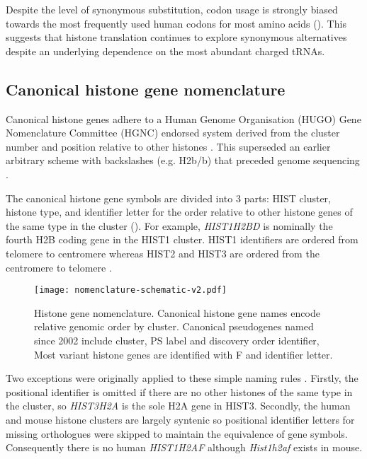 	Despite the level of synonymous substitution, 
	codon usage is strongly biased towards the most frequently used human codons for most amino acids (). 
	This suggests that histone translation continues to explore synonymous alternatives 
	despite an underlying dependence on the most abundant charged tRNAs.

\subsection{Canonical histone gene nomenclature}
	Canonical histone genes adhere to a Human Genome Organisation (HUGO) Gene Nomenclature Committee (HGNC) 
	endorsed system derived from the cluster number and position relative to other histones \citep{Marzluff02}. 
	This superseded an earlier arbitrary scheme with backslashes (e.g. H2b/b) 
	that preceded genome sequencing \citep{AlbigGenomics1997,AlbigHumangen1997}.

	The canonical histone gene symbols are divided into 3 parts: 
	HIST cluster, histone type, and identifier letter
	for the order relative to other histone genes of the same type in the cluster ().
	For example, \textit{HIST1H2BD} is nominally the fourth H2B coding gene in the HIST1 cluster.
	HIST1 identifiers are ordered from telomere to centromere 
	whereas HIST2 and HIST3 are ordered from the centromere to telomere \citep{Marzluff02}.

\begin{figure*}
	\centering
	\texttt{[image: nomenclature-schematic-v2.pdf]}
	\caption{Histone gene nomenclature. 
	Canonical histone gene names encode relative genomic order by cluster.
	Canonical pseudogenes named since 2002 include cluster, PS label and discovery order identifier,
	Most variant histone genes are identified with F and identifier letter.}
	\label{fig:nomenclature}
\end{figure*}

	Two exceptions were originally applied to these simple naming rules \citep{Marzluff02}. 
	Firstly, the positional identifier is omitted if there are no other histones of the same type in the cluster, 
	so \textit{HIST3H2A} is the sole H2A gene in HIST3. 
	Secondly, the human and mouse histone clusters are largely syntenic 
	so positional identifier letters for missing orthologues were skipped to maintain the equivalence of gene symbols.
	Consequently there is no human \textit{HIST1H2AF} although \textit{Hist1h2af} exists in mouse.

